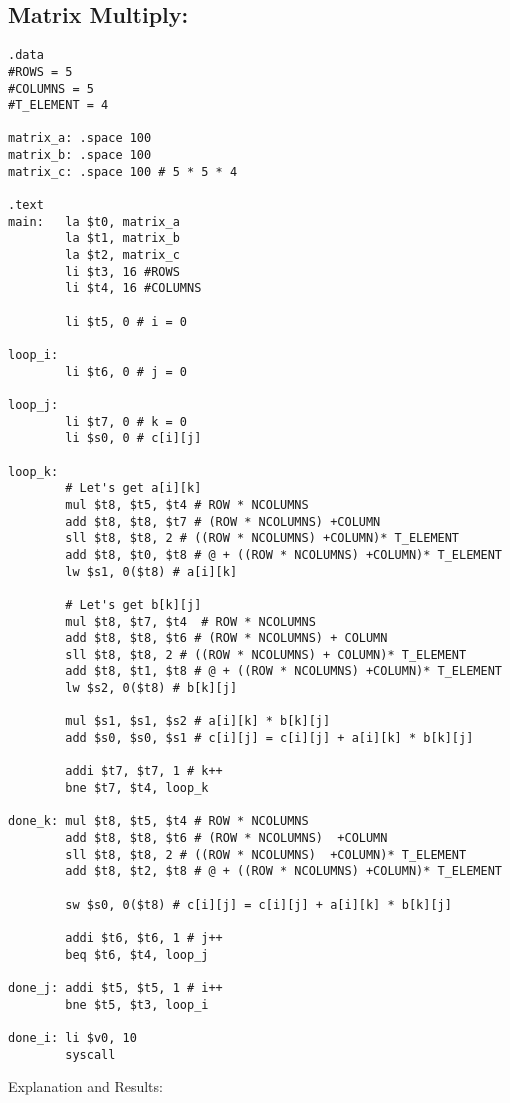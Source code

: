 \documentclass{article}
\begin{document}
\subsection{Matrix Multiply:}
\vspace{5pt}
\begin{lstlisting} 
.data
#ROWS = 5
#COLUMNS = 5
#T_ELEMENT = 4

matrix_a: .space 100
matrix_b: .space 100
matrix_c: .space 100 # 5 * 5 * 4

.text
main:	la $t0, matrix_a
		la $t1, matrix_b
		la $t2, matrix_c
		li $t3, 16 #ROWS
		li $t4, 16 #COLUMNS

		li $t5, 0 # i = 0
		
loop_i:	
		li $t6, 0 # j = 0

loop_j:	
		li $t7, 0 # k = 0
		li $s0, 0 # c[i][j]

loop_k:	
        # Let's get a[i][k]
		mul $t8, $t5, $t4 # ROW * NCOLUMNS
		add $t8, $t8, $t7 # (ROW * NCOLUMNS) +COLUMN
		sll $t8, $t8, 2 # ((ROW * NCOLUMNS) +COLUMN)* T_ELEMENT
		add $t8, $t0, $t8 # @ + ((ROW * NCOLUMNS) +COLUMN)* T_ELEMENT		
		lw $s1, 0($t8) # a[i][k]
        
		# Let's get b[k][j]
		mul $t8, $t7, $t4  # ROW * NCOLUMNS  
		add $t8, $t8, $t6 # (ROW * NCOLUMNS) + COLUMN
		sll $t8, $t8, 2 # ((ROW * NCOLUMNS) + COLUMN)* T_ELEMENT
		add $t8, $t1, $t8 # @ + ((ROW * NCOLUMNS) +COLUMN)* T_ELEMENT		
		lw $s2, 0($t8) # b[k][j]
        
		mul $s1, $s1, $s2 # a[i][k] * b[k][j]
		add $s0, $s0, $s1 # c[i][j] = c[i][j] + a[i][k] * b[k][j]
        
		addi $t7, $t7, 1 # k++
		bne $t7, $t4, loop_k

done_k:	mul $t8, $t5, $t4 # ROW * NCOLUMNS
		add $t8, $t8, $t6 # (ROW * NCOLUMNS)  +COLUMN
		sll $t8, $t8, 2 # ((ROW * NCOLUMNS)  +COLUMN)* T_ELEMENT
		add $t8, $t2, $t8 # @ + ((ROW * NCOLUMNS) +COLUMN)* T_ELEMENT

		sw $s0, 0($t8) # c[i][j] = c[i][j] + a[i][k] * b[k][j]
		
		addi $t6, $t6, 1 # j++
		beq $t6, $t4, loop_j

done_j:	addi $t5, $t5, 1 # i++
		bne $t5, $t3, loop_i

done_i: li $v0, 10
		syscall
\end{lstlisting}
Explanation and Results:\\
\end{document}
